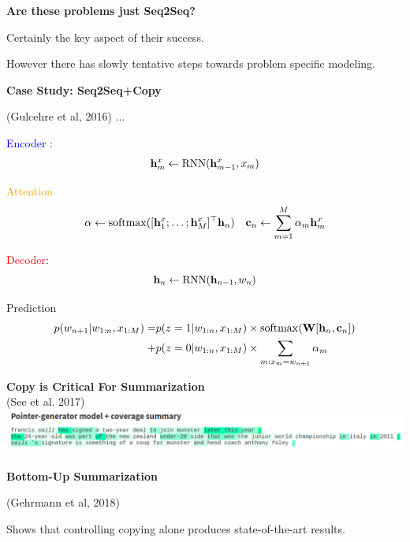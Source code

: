 \documentclass[aspectratio=169]{beamer}
\let\tempone\itemize
\let\temptwo\enditemize
\renewenvironment{itemize}{\tempone\addtolength{\itemsep}{0.5\baselineskip}}{\temptwo}
\newcommand{\air}{\vspace{0.25cm}}
\begin{document}
\begin{frame}
  \begin{center}
    \textbf{Are these problems just Seq2Seq?}

    \begin{itemize}
    \item Certainly the key aspect of their success.
      \air

    \item However there has slowly tentative steps towards problem
      specific modeling.
    \end{itemize}
  \end{center}
\end{frame}


\begin{frame}
  \begin{center}
    \textbf{Case Study: Seq2Seq+Copy}

    \small{(Gulcehre et al, 2016) ...}
  \end{center}
  \textcolor{blue}{Encoder} :
  \[{\mathbf{h}^{x}_m \gets \operatorname*{RNN}(\mathbf{h}^{x}_{m-1}, x_m)} \]


  \textcolor{orange}{Attention}
  \[\alpha \gets  \operatorname*{softmax}(   [\mathbf{h}^{x}_1 ; \ldots; \mathbf{h}^{x}_M]^\top \mathbf{h}_{n} )\ \ \ {\mathbf{c}_n} \gets \sum_{m =1}^M \alpha_m \mathbf{h}_m^{x}  \]

  \textcolor{red}{Decoder}:
  \[{\mathbf{h}_n \gets \operatorname*{RNN}(\mathbf{h}_{n-1}, w_n)} \]

  Prediction
  \begin{eqnarray*}
  p(w_{n+1} | w_{1:n}, x_{1:M}) = & p(z = 1 |  w_{1:n}, x_{1:M}) \times \operatorname*{softmax}( \mathbf{W} [\mathbf{h}_n, \mathbf{c}_n])   \\+ &\displaystyle p(z=0 | w_{1:n}, x_{1:M}) \times \sum_{m: x_m = w_{n+1}} \alpha_m
  \end{eqnarray*}
\end{frame}

\begin{frame}
\begin{center}
    \textbf{Copy is Critical For Summarization }
    \\
    \small{(See et al. 2017)}
      \includegraphics[width=15cm]{seeblog}
\pause

      \textbf{Bottom-Up Summarization}

 (Gehrmann et al, 2018)


 \begin{itemize}
 \item Shows that controlling copying alone produces state-of-the-art
   results.
 \end{itemize}
\end{center}
\end{frame}
\end{document}

